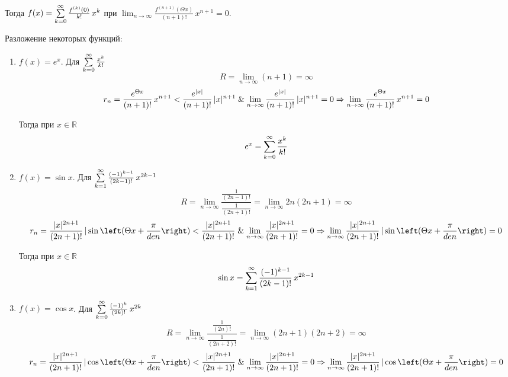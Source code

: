 Тогда $f(x) = \series[0] \frac{f^{(k)}(0)}{k!}\,x^k$ при $\lim_{n \to \infty} \frac{f^{(n+1)}(\Theta x)}{(n + 1)!}\,x^{n+1} = 0$.

Разложение некоторых функций:
\begin{enumerate}
	\item $f(x) = e^x$.
	Для $\series[0] \frac{x^k}{k!}$
	\begin{equation*}
	R = \lim_{n \to \infty} (n + 1) = \infty
	\end{equation*}
	\begin{equation*}
	r_n = \frac{e^{\Theta x}}{(n + 1)!}\,x^{n+1} <
	\frac{e^{|x|}}{(n + 1)!}\,|x|^{n+1} \mathrel{\&}
	\lim_{n \to \infty} \frac{e^{|x|}}{(n + 1)!}\,|x|^{n+1} = 0 \Rightarrow
	\lim_{n \to \infty} \frac{e^{\Theta x}}{(n + 1)!}\,x^{n+1} = 0
	\end{equation*}
	
	Тогда при $x \in \mathbb R$
	\begin{equation*}
	e^x = \series[0] \frac{x^k}{k!}
	\end{equation*}
	
	\item $f(x) = \sin x$.
	Для $\series \frac{(-1)^{k-1}}{(2k - 1)!}\,x^{2k-1}$
	\begin{equation*}
	R = \lim_{n \to \infty} \frac
	{\frac1{(2n - 1)!}}
	{\frac1{(2n + 1)!}} =
	\lim_{n \to \infty} 2n (2n + 1) = \infty
	\end{equation*}
	\begin{equation*}
	r_n = \frac{|x|^{2n+1}}{(2n + 1)!}\,|\sin \left( \Theta x + \frac{\pi}{den} \right) <
	\frac{|x|^{2n+1}}{(2n + 1)!} \lAnd
	\lim_{n \to \infty} \frac{|x|^{2n+1}}{(2n + 1)!} = 0 \Rightarrow
	\lim_{n \to \infty} \frac{|x|^{2n+1}}{(2n + 1)!}\,|\sin \left( \Theta x + \frac{\pi}{den} \right) = 0
	\end{equation*}
	
	Тогда при $x \in \mathbb R$
	\begin{equation*}
	\sin x = \series \frac{(-1)^{k-1}}{(2k - 1)!}\,x^{2k-1}
	\end{equation*}
	
	\item $f(x) = \cos x$.
	Для $\series[0] \frac{(-1)^k}{(2k)!}\,x^{2k}$
	\begin{equation*}
	R = \lim_{n \to \infty} \frac
	{\frac1{(2n)!}}
	{\frac1{(2n + 2)!}} =
	\lim_{n \to \infty} (2n + 1) (2n + 2) = \infty
	\end{equation*}
	\begin{equation*}
	r_n = \frac{|x|^{2n+1}}{(2n + 1)!}\,|\cos \left( \Theta x + \frac{\pi}{den} \right) <
	\frac{|x|^{2n+1}}{(2n + 1)!} \lAnd
	\lim_{n \to \infty} \frac{|x|^{2n+1}}{(2n + 1)!} = 0 \Rightarrow
	\lim_{n \to \infty} \frac{|x|^{2n+1}}{(2n + 1)!}\,|\cos \left( \Theta x + \frac{\pi}{den} \right) = 0
	\end{equation*}
	

\end{enumerate}
